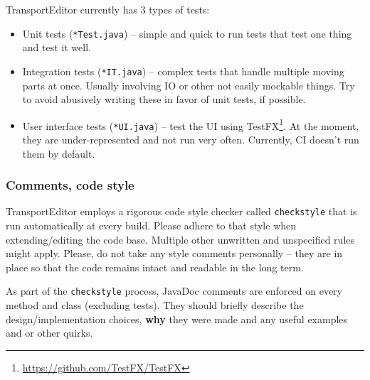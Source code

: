 TransportEditor currently has 3 types of tests:

\begin{itemize}
\item Unit tests (\texttt{*Test.java}) -- simple and quick to run tests that test one thing and test it well.

\item Integration tests (\texttt{*IT.java}) -- complex tests that handle multiple moving parts at once. Usually involving IO or
other not easily mockable things. Try to avoid abusively writing these in favor of unit tests, if possible.

\item User interface tests (\texttt{*UI.java}) -- test the UI using TestFX\footnote{\url{https://github.com/TestFX/TestFX}}.
At the moment, they are under-represented and not run very often. Currently, CI doesn't run them by default.
\end{itemize}

\subsubsection*{Comments, code style}
TransportEditor employs a rigorous code style checker called \texttt{checkstyle} that is run automatically at every build.
Please adhere to that style when extending/editing the code base. Multiple other unwritten and unspecified rules might
apply. Please, do not take any style comments personally -- they are in place so that the code remains intact and
readable in the long term.

As part of the \texttt{checkstyle} process, JavaDoc comments are enforced on every method and class (excluding tests).
They should briefly describe the design/implementation choices, \textbf{why} they were made and any useful examples and or
other quirks.


